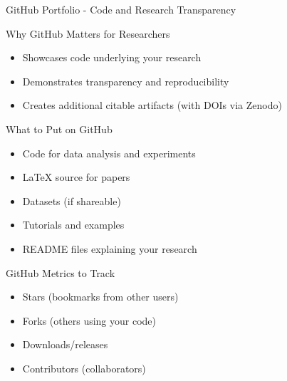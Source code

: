 \documentclass[11pt]{beamer}
\begin{document}
				\begin{frame}{GitHub Portfolio - Code and Research Transparency}
					\scriptsize
					\begin{block}{Why GitHub Matters for Researchers}
						\begin{itemize}
							\item Showcases code underlying your research
							\item Demonstrates transparency and reproducibility
							\item Creates additional citable artifacts (with DOIs via Zenodo)
						\end{itemize}
					\end{block}
					\begin{block}{What to Put on GitHub}
						\begin{itemize}
							\item Code for data analysis and experiments
							\item LaTeX source for papers
							\item Datasets (if shareable)
							\item Tutorials and examples
							\item README files explaining your research
						\end{itemize}
					\end{block}
					\begin{block}{GitHub Metrics to Track}
						\begin{itemize}
							\item Stars (bookmarks from other users)
							\item Forks (others using your code)
							\item Downloads/releases
							\item Contributors (collaborators)
						\end{itemize}
					\end{block}
				\end{frame}
				
\end{document}
